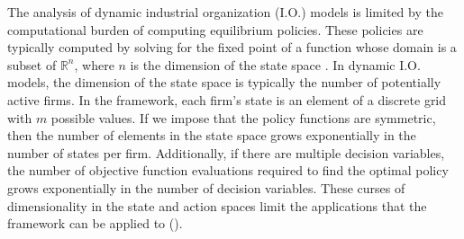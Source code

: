 \documentclass[12pt]{article}
\begin{document}


The analysis of dynamic industrial organization (I.O.) models is limited by the computational burden of computing equilibrium policies. These policies are typically computed by solving for the fixed point of a function whose domain is a subset of $\mathbb{R}^n$, where $n$ is the dimension of the state space \citep{1992_Pakes_McGuire_NBER}. In dynamic I.O. models, the dimension of the state space is typically the number of potentially active firms. In the \citet{1995_Erickson_Pakes_RES} framework, each firm's state is an element of a discrete grid with $m$ possible values. If we impose that the policy functions are symmetric, then the number of elements in the state space grows exponentially in the number of states per firm. Additionally, if there are multiple decision variables, the number of objective function evaluations required to find the optimal policy grows exponentially in the number of decision variables. These curses of dimensionality in the state and action spaces limit the applications that the \citet{1995_Erickson_Pakes_RES} framework can be applied to (\cite{2001_Pakes_McGuire_RAND, 2008_Weintraub_Benkard_VanRoy_Econometrica, 2007_Doraszelski_Judd, 2011_Aguirregabiria_Nevo_working}).
\end{document}
